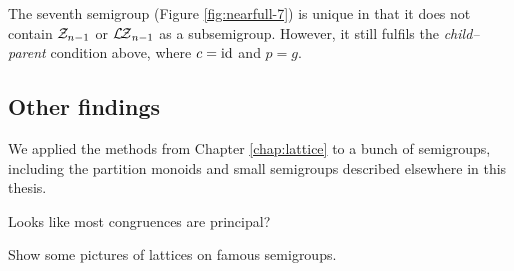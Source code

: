 The seventh semigroup (Figure \ref{fig:nearfull-7}) is unique in that it does
not contain $\mathcal{Z}_{n-1}$ or $\mathcal{L\!Z}_{n-1}$ as a subsemigroup.  However, it still
fulfils the \textit{child--parent} condition above, where $c = \operatorname{id}$ and $p = g$.

\subsection{Other findings}
We applied the methods from Chapter \ref{chap:lattice} to a bunch of semigroups,
including the partition monoids and small semigroups described elsewhere in this
thesis.

Looks like most congruences are principal?

Show some pictures of lattices on famous semigroups.

